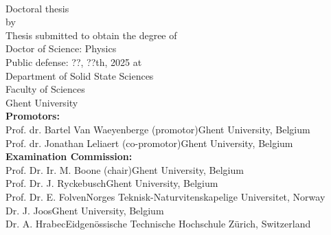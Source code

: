 \thispagestyle{empty}
\noindent

\fontsize{12pt}{14pt}\selectfont

\vspace*{-3cm}
\noindent{}
\vspace{2cm}
\fontsize{22pt}{22pt}\selectfont
\begin{center}
{\textsc{\phdtitle}}\\
\end{center}

\fontsize{14pt}{16pt}\selectfont

\null\hfill Doctoral thesis\\
\null\hfill by \phdauthor\\
\vfill
{}
\fontsize{12pt}{14pt}\selectfont
Thesis submitted to obtain the degree of\\
Doctor of Science: Physics\\
\newline
Public defense: ??, ??th, 2025 at\\ %
Department of Solid State Sciences\\
Faculty of Sciences\\
Ghent University\\


\textbf{Promotors:}\\
Prof. dr. Bartel Van Waeyenberge (promotor)\hfill Ghent University, Belgium\\
Prof. dr. Jonathan Leliaert (co-promotor)\hfill Ghent University, Belgium\\
\newline
\textbf{Examination Commission:}\\
Prof. Dr. Ir. M. Boone (chair)\hfill Ghent University, Belgium\\
Prof. Dr. J. Ryckebusch\hfill Ghent University, Belgium\\
Prof. Dr. E. Folven\hfill Norges Teknisk-Naturvitenskapelige Universitet, Norway\\%
Dr. J. Joos\hfill Ghent University, Belgium\\
Dr. A. Hrabec\hfill Eidgen\"ossische Technische Hochschule Z\"urich, Switzerland\\%

\newpage
